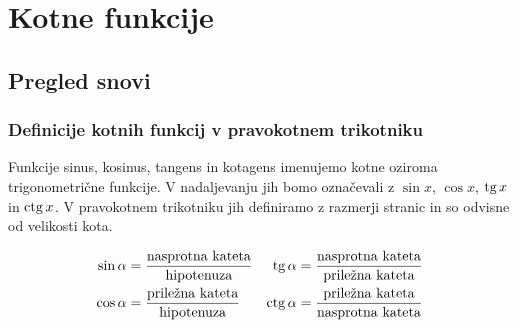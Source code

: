 
\chapter{Kotne funkcije}
\label{cha:sin-cos}

\section{Pregled snovi}
\label{sec:sin-cos-pregled-snovi}

\subsection{Definicije kotnih funkcij v pravokotnem trikotniku}

Funkcije sinus, kosinus, tangens in kotagens imenujemo kotne oziroma trigonometrične funkcije. V nadaljevanju jih bomo označevali z $\sin x$, $\cos x$, $\operatorname{tg} x$ in $\operatorname{ctg} x$. V pravokotnem trikotniku jih definiramo z razmerji stranic in so odvisne od velikosti kota. 

\begin{equation*}
\begin{split}
\sin \alpha &= \frac{\text{nasprotna kateta}}{\text{hipotenuza}} \\
\cos \alpha &= \frac{\text{priležna kateta}}{\text{hipotenuza}}  
\end{split}
\quad
\begin{split}
\operatorname{tg} \alpha &= \frac{\text{nasprotna kateta}}{\text{priležna kateta}}\\
\operatorname{ctg} \alpha &= \frac{\text{priležna kateta}}{\text{nasprotna kateta}}
\end{split}
\end{equation*}

